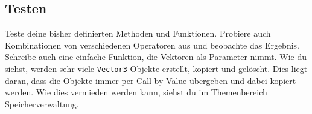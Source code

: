\subsection{Testen}
Teste deine bisher definierten Methoden und Funktionen.
Probiere auch Kombinationen von verschiedenen Operatoren aus und beobachte das Ergebnis.
Schreibe auch eine einfache Funktion, die Vektoren als Parameter nimmt.
Wie du siehst, werden sehr viele \lstinline{Vector3}-Objekte erstellt, kopiert und gelöscht.
Dies liegt daran, dass die Objekte immer per Call-by-Value übergeben und dabei kopiert werden.
Wie dies vermieden werden kann, siehst du im Themenbereich Speicherverwaltung.
